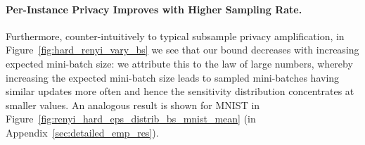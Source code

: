 \paragraph{Per-Instance Privacy Improves with Higher Sampling Rate.} Furthermore, counter-intuitively to typical subsample privacy amplification, in Figure~\ref{fig:hard_renyi_vary_bs} we see that our bound decreases with increasing expected mini-batch size: 
we attribute this to the law of large numbers, whereby increasing the expected mini-batch size leads to sampled mini-batches having similar updates more often and hence the sensitivity distribution concentrates at smaller values. An analogous result is shown for MNIST in Figure~\ref{fig:renyi_hard_eps_distrib_bs_mnist_mean} (in Appendix~\ref{sec:detailed_emp_res}).




